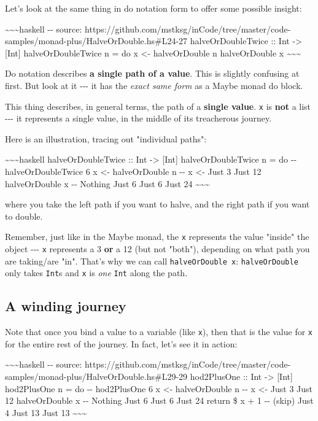 \documentclass[]{article}
\begin{document}
Let's look at the same thing in do notation form to offer some possible insight:

\textasciitilde{}\textasciitilde{}\textasciitilde{}haskell -\/- source:
https://github.com/mstksg/inCode/tree/master/code-samples/monad-plus/HalveOrDouble.hs\#L24-27
halveOrDoubleTwice :: Int -\textgreater{} {[}Int{]} halveOrDoubleTwice n = do x
\textless{}- halveOrDouble n halveOrDouble x
\textasciitilde{}\textasciitilde{}\textasciitilde{}

Do notation describes \textbf{a single path of a value}. This is slightly
confusing at first. But look at it -\/-\/- it has the \emph{exact same form} as
a Maybe monad do block.

This thing describes, in general terms, the path of a \textbf{single value}.
\texttt{x} is \textbf{not} a list -\/-\/- it represents a single value, in the
middle of its treacherous journey.

Here is an illustration, tracing out "individual paths":

\textasciitilde{}\textasciitilde{}\textasciitilde{}haskell halveOrDoubleTwice ::
Int -\textgreater{} {[}Int{]} halveOrDoubleTwice n = do -\/- halveOrDoubleTwice
6 x \textless{}- halveOrDouble n -\/- x \textless{}- Just 3 Just 12
halveOrDouble x -\/- Nothing Just 6 Just 6 Just 24
\textasciitilde{}\textasciitilde{}\textasciitilde{}

where you take the left path if you want to halve, and the right path if you
want to double.

Remember, just like in the Maybe monad, the \texttt{x} represents the value
"inside" the object -\/-\/- \texttt{x} represents a 3 \textbf{or} a 12 (but not
"both"), depending on what path you are taking/are "in". That's why we can call
\texttt{halveOrDouble\ x}: \texttt{halveOrDouble} only takes \texttt{Int}s and
\texttt{x} is \emph{one} \texttt{Int} along the path.

\subsection{A winding journey}

Note that once you bind a value to a variable (like \texttt{x}), then that is
the value for \texttt{x} for the entire rest of the journey. In fact, let's see
it in action:

\textasciitilde{}\textasciitilde{}\textasciitilde{}haskell -\/- source:
https://github.com/mstksg/inCode/tree/master/code-samples/monad-plus/HalveOrDouble.hs\#L29-29
hod2PlusOne :: Int -\textgreater{} {[}Int{]} hod2PlusOne n = do -\/- hod2PlusOne
6 x \textless{}- halveOrDouble n -\/- x \textless{}- Just 3 Just 12
halveOrDouble x -\/- Nothing Just 6 Just 6 Just 24 return \$ x + 1 -\/- (skip)
Just 4 Just 13 Just 13 \textasciitilde{}\textasciitilde{}\textasciitilde{}
\end{document}
